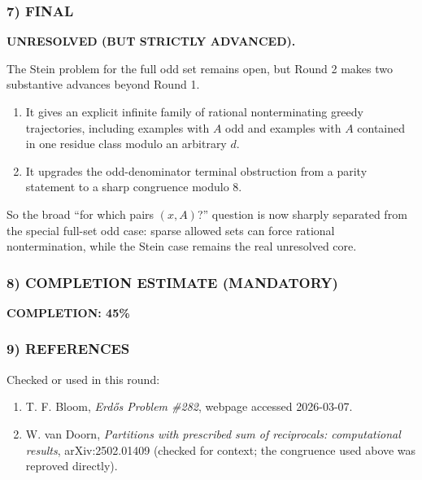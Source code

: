 \subsubsection*{7) FINAL}
\textbf{UNRESOLVED (BUT STRICTLY ADVANCED).}

The Stein problem for the full odd set remains open, but Round 2 makes two substantive advances beyond Round 1.
\begin{enumerate}
\item It gives an explicit infinite family of rational nonterminating greedy trajectories, including examples with $A$ odd and examples with $A$ contained in one residue class modulo an arbitrary $d$.
\item It upgrades the odd-denominator terminal obstruction from a parity statement to a sharp congruence modulo $8$.
\end{enumerate}
So the broad ``for which pairs $(x,A)$?'' question is now sharply separated from the special full-set odd case: sparse allowed sets can force rational nontermination, while the Stein case remains the real unresolved core.

\subsubsection*{8) COMPLETION ESTIMATE (MANDATORY)}
\textbf{COMPLETION: 45\%}

\subsubsection*{9) REFERENCES}
Checked or used in this round:
\begin{enumerate}
\item T. F. Bloom, \emph{Erd\H{o}s Problem \#282}, webpage accessed 2026-03-07.
\item W. van Doorn, \emph{Partitions with prescribed sum of reciprocals: computational results}, arXiv:2502.01409 (checked for context; the congruence used above was reproved directly).
\end{enumerate}

